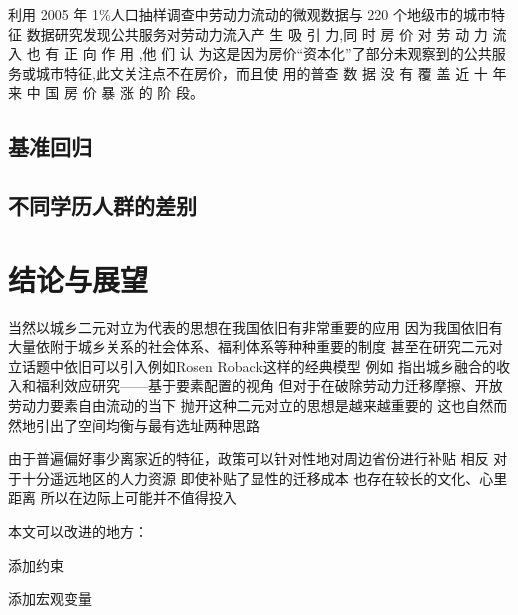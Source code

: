 \documentclass[a4paper,12pt,oneside]{book} %
\begin{document}
\cite{XiaYiRanChengShiJianDeMengMuSanQianGongGongFuWuYingXiangLaoDongLiLiuXiangDeJingYanYanJiu2015} 利用 2005 年 1\%人口抽样调查中劳动力流动的微观数据与 220 个地级市的城市特征 数据研究发现公共服务对劳动力流入产 生 吸 引 力,同 时 房 价 对 劳 动 力 流 入 也 有 正 向 作 用 ,他 们 认 为这是因为房价“资本化”了部分未观察到的公共服务或城市特征,此文关注点不在房价，而且使 用的普查 数 据 没 有 覆 盖 近 十 年 来 中 国 房 价 暴 涨 的 阶 段。

\section{基准回归} %
\label{sub:基准回归}



\section{不同学历人群的差别} %
\label{sub:不同学历人群的差别}




\chapter{结论与展望}

当然以城乡二元对立为代表的思想在我国依旧有非常重要的应用 因为我国依旧有大量依附于城乡关系的社会体系、福利体系等种种重要的制度
甚至在研究二元对立话题中依旧可以引入例如Rosen Roback这样的经典模型
例如 
\cite{GuoDongMeiChengXiangRongHeDeShouRuHeFuLiXiaoYingYanJiuJiYuYaoSuPeiZhiDeShiJiao2023}指出城乡融合的收入和福利效应研究——基于要素配置的视角
但对于在破除劳动力迁移摩擦、开放劳动力要素自由流动的当下
抛开这种二元对立的思想是越来越重要的
这也自然而然地引出了空间均衡与最有选址两种思路



由于普遍偏好事少离家近的特征，政策可以针对性地对周边省份进行补贴
相反 对于十分遥远地区的人力资源 即使补贴了显性的迁移成本 也存在较长的文化、心里距离 所以在边际上可能并不值得投入



本文可以改进的地方：

添加约束

添加宏观变量
\end{document}

